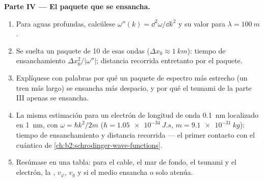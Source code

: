 \begin{problem}
\medskip
\noindent\textbf{Parte IV --- El paquete que se ensancha.}
\begin{enumerate}[resume]
  \item Para aguas profundas, calcúlese $\omega''(k) = \dd^2\omega/\dd k^2$ y su
        valor para $\lambda = \qty{100}{m}$.
  \item Se suelta un paquete de \qty{10}{} de esas ondas ($\Delta x_0 \approx \qty{1}{km}$):
        tiempo de ensanchamiento $\Delta x_0^2/|\omega''|$; distancia recorrida
        entretanto por el paquete.
  \item Explíquese con palabras por qué un paquete de espectro más
        estrecho (un tren más largo) se ensancha más despacio, y por qué
        el tsunami de la parte III apenas se ensancha.
  \item La misma estimación para un electrón de longitud de onda
        \qty{0.1}{nm} localizado en \qty{1}{nm}, con $\omega = \hbar k^2/2m$ ($\hbar =
        \qty{1.05e-34}{J.s}$, $m = \qty{9.1e-31}{kg}$): tiempo de
        ensanchamiento y distancia recorrida --- el primer contacto con el
         cuántico de \cref{ch:b2:schrodinger-wave-functions}.
  \item Resúmase en una tabla: para el cable, el mar de fondo, el tsunami
        y el electrón, la , $v_\varphi$, $v_g$ y si el
        medio ensancha o solo atenúa.
\end{enumerate}
\end{problem}
